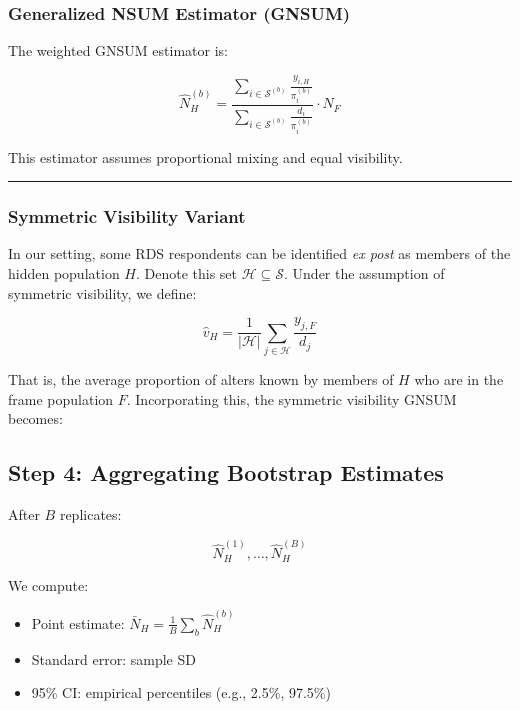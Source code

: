 \documentclass[
  12pt,
  letterpaper,
  DIV=11,
  numbers=noendperiod]{scrartcl}
\theoremstyle{plain}
\theoremstyle{definition}
\begin{document}
\subsubsection{Generalized NSUM Estimator
(GNSUM)}\label{generalized-nsum-estimator-gnsum}

The weighted GNSUM estimator is:

\[
\hat{N}_H^{(b)} = \frac{\sum_{i \in \mathcal{S}^{(b)}} \frac{y_{i,H}}{\pi_i^{(b)}}}{\sum_{i \in \mathcal{S}^{(b)}} \frac{d_i}{\pi_i^{(b)}}} \cdot N_F
\]

This estimator assumes proportional mixing and equal visibility.

\begin{center}\rule{0.5\linewidth}{0.5pt}\end{center}

\subsubsection{Symmetric Visibility
Variant}\label{symmetric-visibility-variant}

In our setting, some RDS respondents can be identified \emph{ex post} as
members of the hidden population \(H\). Denote this set
\(\mathcal{H} \subseteq \mathcal{S}\). Under the assumption of symmetric
visibility, we define:

\[
\hat{v}_{H} = \frac{1}{|\mathcal{H}|} \sum_{j \in \mathcal{H}} \frac{y_{j,F}}{d_j}
\]

That is, the average proportion of alters known by members of \(H\) who
are in the frame population \(F\). Incorporating this, the symmetric
visibility GNSUM becomes:

\subsection{Step 4: Aggregating Bootstrap
Estimates}\label{step-4-aggregating-bootstrap-estimates}

After \(B\) replicates:

\[\hat{N}_H^{(1)}, \dots, \hat{N}_H^{(B)}\]

We compute:

\begin{itemize}
\item
  Point estimate: \(\bar{N}_H = \frac{1}{B} \sum_b \hat{N}_H^{(b)}\)
\item
  Standard error: sample SD
\item
  95\% CI: empirical percentiles (e.g., 2.5\%, 97.5\%)
\end{itemize}
\end{document}
